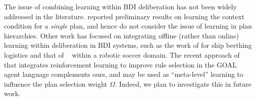 The issue of combining learning within BDI deliberation has not been widely addressed in the literature.
\citet{hernandez04:learning} reported preliminary results on learning the context condition for a \emph{single} plan, and hence do not consider the issue of learning in plan hierarchies.
Other work has focused on integrating offline (rather than online) learning within deliberation in BDI systems, such as the work of \citet{lokuge07:improving} for ship berthing logistics and that of ~\citet{riedmiller01:karlsruhe} within a robotic soccer domain.
The recent approach of \citet{broekens10:reinforcement} that integrates reinforcement learning to improve rule selection in the GOAL agent language complements ours, and may be used as ``meta-level'' learning to influence the plan selection weight $\Omega$. Indeed, we plan to investigate this in future work.







